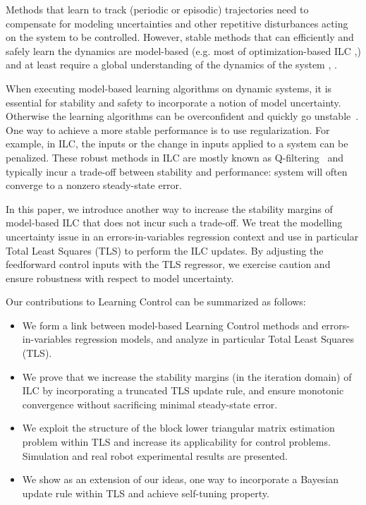 \documentclass[10pt,a4paper]{article}
\theoremstyle{plain}
\theoremstyle{definition}
\begin{document}
Methods that learn to track (periodic or episodic) trajectories need to compensate for modeling uncertainties and other repetitive disturbances acting on the system to be controlled. However, stable methods that can efficiently and safely learn the dynamics are model-based (e.g. most of optimization-based ILC \cite{Amann95},\cite{Bristow06}) and at least require a global understanding of the dynamics of the system \cite{Kolter09}, \cite{NguyenTuong11}.

When executing model-based learning algorithms on dynamic systems, it is essential for stability and safety to incorporate a notion of model uncertainty. Otherwise the learning algorithms can be overconfident and quickly go unstable~\cite{Longman2000}. One way to achieve a more stable performance is to use regularization. For example, in ILC, the inputs or the change in inputs applied to a system can be penalized. These robust methods in ILC are mostly known as Q-filtering~\cite{Bristow06} and typically incur a trade-off between stability and performance: system will often converge to a nonzero steady-state error. %

In this paper, we introduce another way to increase the stability margins of model-based ILC that does not incur such a trade-off. We treat the modelling uncertainty issue in an errors-in-variables regression context and use in particular Total Least Squares (TLS) \cite{Golub80} to perform the ILC updates. By adjusting the feedforward control inputs with the TLS regressor, we exercise caution and ensure robustness with respect to model uncertainty. %

Our contributions to Learning Control can be summarized as follows:

\begin{itemize}
\item We form a link between model-based Learning Control methods and errors-in-variables regression models, and analyze in particular Total Least Squares (TLS).
\item We prove that we increase the stability margins (in the iteration domain) of ILC by incorporating a truncated TLS update rule, and ensure monotonic convergence without sacrificing minimal steady-state error. 
\item We exploit the structure of the block lower triangular matrix estimation problem within TLS and increase its applicability for control problems. Simulation and real robot experimental results are presented.
\item We show as an extension of our ideas, one way to incorporate a Bayesian update rule within TLS and achieve self-tuning property. 
\end{itemize}
\end{document}
